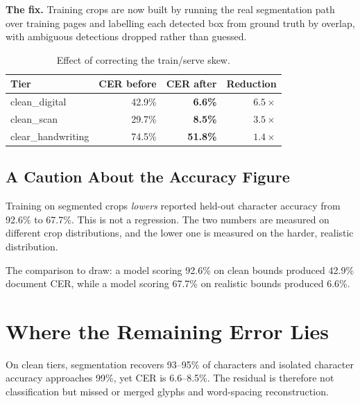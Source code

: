 \documentclass[11pt,a4paper]{article}
\begin{document}
\textbf{The fix.} Training crops are now built by running the real segmentation
path over training pages and labelling each detected box from ground truth by
overlap, with ambiguous detections dropped rather than guessed.

\begin{table}[h]
\centering
\caption{Effect of correcting the train/serve skew.}
\begin{tabular}{@{}lrrr@{}}
\toprule
Tier & CER before & CER after & Reduction \\
\midrule
clean\_digital & 42.9\% & \textbf{6.6\%} & $6.5\times$ \\
clean\_scan & 29.7\% & \textbf{8.5\%} & $3.5\times$ \\
clear\_handwriting & 74.5\% & \textbf{51.8\%} & $1.4\times$ \\
\bottomrule
\end{tabular}
\end{table}

\subsection{A Caution About the Accuracy Figure}

Training on segmented crops \emph{lowers} reported held-out character accuracy
from 92.6\% to 67.7\%. This is not a regression. The two numbers are measured on
different crop distributions, and the lower one is measured on the harder,
realistic distribution.

The comparison to draw: a model scoring 92.6\% on clean bounds produced 42.9\%
document CER, while a model scoring 67.7\% on realistic bounds produced 6.6\%.


\section{Where the Remaining Error Lies}

On clean tiers, segmentation recovers 93--95\% of characters and isolated
character accuracy approaches 99\%, yet CER is 6.6--8.5\%. The residual is
therefore not classification but missed or merged glyphs and word-spacing
reconstruction.
\end{document}
